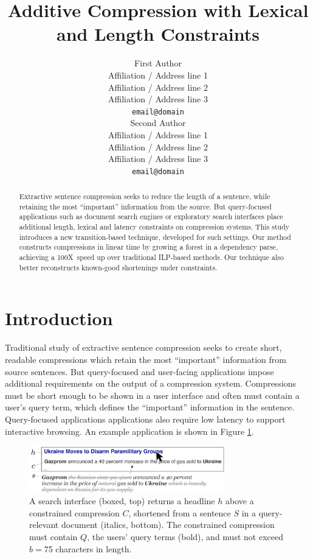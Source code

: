 \documentclass[11pt,a4paper]{article}
\title{Additive Compression with Lexical and Length Constraints}
\author{First Author \\
  Affiliation / Address line 1 \\
  Affiliation / Address line 2 \\
  Affiliation / Address line 3 \\
  {\tt email@domain} \\\And
  Second Author \\
  Affiliation / Address line 1 \\
  Affiliation / Address line 2 \\
  Affiliation / Address line 3 \\
  {\tt email@domain} \\}
\date{}
\newcommand{\speedup}[0]{100X~}
\begin{document}
\maketitle

\begin{abstract}
Extractive sentence compression seeks to reduce the length of a sentence, while retaining the most ``important'' information from the source. But query-focused applications such as document search engines or exploratory search interfaces place additional length, lexical and latency constraints on compression systems. This study introduces a new transition-based technique, developed for such settings. Our method constructs compressions in linear time by growing a forest in a dependency parse, achieving a \speedup speed up over traditional ILP-based methods. Our technique also better reconstructs known-good shortenings under constraints.
\end{abstract}

\section{Introduction}\label{s:intro}

Traditional study of extractive sentence compression seeks to create short, readable compressions which retain the most ``important'' information from source sentences. But query-focused and user-facing applications impose additional requirements on the output of a compression system. Compressions must be short enough to be shown in a user interface and often must contain a user's query term, which defines the ``important'' information in the sentence. Query-focused applications applications also require low latency to support interactive browsing. An example application is shown in Figure \ref{f:qf}.

\begin{figure}[htb!]
\includegraphics[width=8.5cm]{qf.pdf}
\caption{A search interface (boxed, top) returns a headline $h$ above a constrained compression $C$, shortened from a sentence $S$ in a query-relevant document (italics, bottom). The constrained compression must contain $Q$, the users' query terms (bold), and must not exceed $b=$75 characters in length.}
\label{f:qf}
\end{figure}
\end{document}
